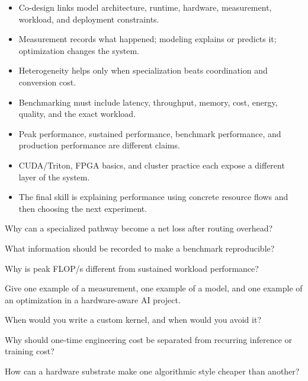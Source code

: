 \begin{chaptersummary}
\begin{itemize}[leftmargin=*]
  \item Co-design links model architecture, runtime, hardware, measurement, workload, and deployment constraints.
  \item Measurement records what happened; modeling explains or predicts it; optimization changes the system.
  \item Heterogeneity helps only when specialization beats coordination and conversion cost.
  \item Benchmarking must include latency, throughput, memory, cost, energy, quality, and the exact workload.
  \item Peak performance, sustained performance, benchmark performance, and production performance are different claims.
  \item CUDA/Triton, FPGA basics, and cluster practice each expose a different layer of the system.
  \item The final skill is explaining performance using concrete resource flows and then choosing the next experiment.
\end{itemize}
\end{chaptersummary}

\begin{conceptquestions}
\item Why can a specialized pathway become a net loss after routing overhead?
\item What information should be recorded to make a benchmark reproducible?
\item Why is peak FLOP/s different from sustained workload performance?
\item Give one example of a measurement, one example of a model, and one example of an optimization in a hardware-aware AI project.
\item When would you write a custom kernel, and when would you avoid it?
\item Why should one-time engineering cost be separated from recurring inference or training cost?
\item How can a hardware substrate make one algorithmic style cheaper than another?
\end{conceptquestions}

